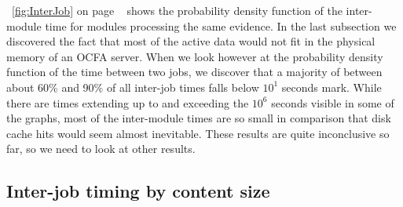  ~\ref{fig:InterJob} on page ~\pageref{fig:InterJob} shows the probability density function of the inter-module time for modules processing the same evidence.
In the last subsection we discovered the fact that most of the active data would not fit in the physical memory of an OCFA server. When we look however at the probability density function of the time between two jobs, we discover that a majority of between about 60\% and 90\% of all inter-job times falls below $10^1$ seconds mark. While there are times extending up to and exceeding the $10^6$ seconds visible in some of the graphs, most of the inter-module times are so small in comparison that disk cache hits would seem almost inevitable. These results are quite inconclusive so far, so we need to look at other results.
\subsection{Inter-job timing by content size}
